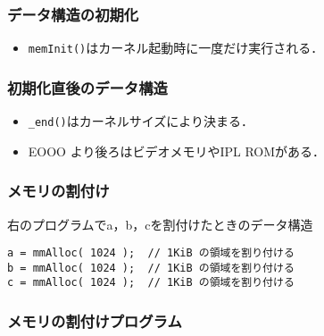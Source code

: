 \documentclass[unicode,handout]{beamer}                   %
\begin{document}
\begin{frame}
  \frametitle{データ構造の初期化}
  \begin{itemize}
  \item {\tt memInit()}はカーネル起動時に一度だけ実行される．
  \end{itemize}
\end{frame}

\begin{frame}
  \frametitle{初期化直後のデータ構造}
  \begin{itemize}
  \item {\tt \_end()}はカーネルサイズにより決まる．
  \item EOOO より後ろはビデオメモリやIPL ROMがある．
  \end{itemize}
\end{frame}

\begin{frame}[fragile]
  \frametitle{メモリの割付け}
  右のプログラムでa，b，cを割付けたときのデータ構造
  \begin{center}
    \begin{minipage}{0.39\columnwidth}
    \end{minipage}
    \begin{minipage}{0.59\columnwidth}
      \begin{lstlisting}
a = mmAlloc( 1024 );  // 1KiB の領域を割り付ける
b = mmAlloc( 1024 );  // 1KiB の領域を割り付ける
c = mmAlloc( 1024 );  // 1KiB の領域を割り付ける
      \end{lstlisting}
    \end{minipage}
  \end{center}
  \vfill
\end{frame}

\begin{frame}
  \frametitle{メモリの割付けプログラム}
\end{frame}
\end{document}
